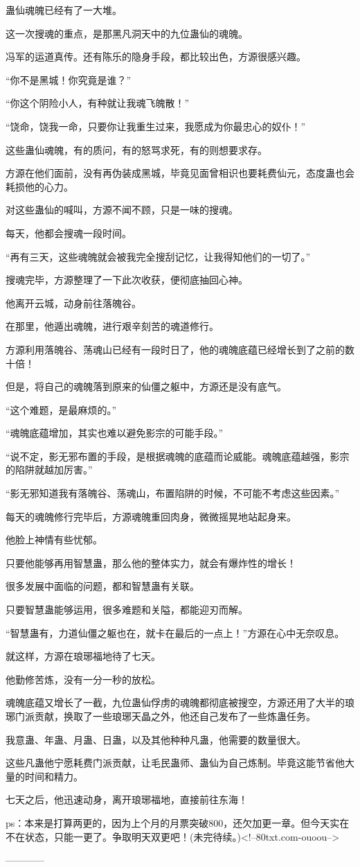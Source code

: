 \begin{this_body}
蛊仙魂魄已经有了一大堆。

这一次搜魂的重点，是那黑凡洞天中的九位蛊仙的魂魄。

冯军的运道真传。还有陈乐的隐身手段，都比较出色，方源很感兴趣。

“你不是黑城！你究竟是谁？”

“你这个阴险小人，有种就让我魂飞魄散！”

“饶命，饶我一命，只要你让我重生过来，我愿成为你最忠心的奴仆！”

这些蛊仙魂魄，有的质问，有的怒骂求死，有的则想要求存。

方源在他们面前，没有再伪装成黑城，毕竟见面曾相识也要耗费仙元，态度蛊也会耗损他的心力。

对这些蛊仙的喊叫，方源不闻不顾，只是一味的搜魂。

每天，他都会搜魂一段时间。

“再有三天，这些魂魄就会被我完全搜刮记忆，让我得知他们的一切了。”

搜魂完毕，方源整理了一下此次收获，便彻底抽回心神。

他离开云城，动身前往落魄谷。

在那里，他遁出魂魄，进行艰辛刻苦的魂道修行。

方源利用落魄谷、荡魂山已经有一段时日了，他的魂魄底蕴已经增长到了之前的数十倍！

但是，将自己的魂魄落到原来的仙僵之躯中，方源还是没有底气。

“这个难题，是最麻烦的。”

“魂魄底蕴增加，其实也难以避免影宗的可能手段。”

“说不定，影无邪布置的手段，是根据魂魄的底蕴而论威能。魂魄底蕴越强，影宗的陷阱就越加厉害。”

“影无邪知道我有落魄谷、荡魂山，布置陷阱的时候，不可能不考虑这些因素。”

每天的魂魄修行完毕后，方源魂魄重回肉身，微微摇晃地站起身来。

他脸上神情有些忧郁。

只要他能够再用智慧蛊，那么他的整体实力，就会有爆炸性的增长！

很多发展中面临的问题，都和智慧蛊有关联。

只要智慧蛊能够运用，很多难题和关隘，都能迎刃而解。

“智慧蛊有，力道仙僵之躯也在，就卡在最后的一点上！”方源在心中无奈叹息。

就这样，方源在琅琊福地待了七天。

他勤修苦炼，没有一分一秒的放松。

魂魄底蕴又增长了一截，九位蛊仙俘虏的魂魄都彻底被搜空，方源还用了大半的琅琊门派贡献，换取了一些琅琊天晶之外，他还自己发布了一些炼蛊任务。

我意蛊、年蛊、月蛊、日蛊，以及其他种种凡蛊，他需要的数量很大。

这些凡蛊他宁愿耗费门派贡献，让毛民蛊师、蛊仙为自己炼制。毕竟这能节省他大量的时间和精力。

七天之后，他迅速动身，离开琅琊福地，直接前往东海！

ps：本来是打算两更的，因为上个月的月票突破800，还欠加更一章。但今天实在不在状态，只能一更了。争取明天双更吧！(未完待续。)<!--80txt.com-ouoou-->

------------

\end{this_body}

